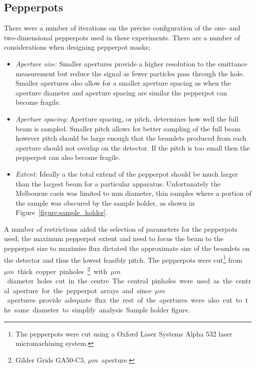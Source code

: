 \subsection{Pepperpots}
There were a number of iterations on the precise configuration of the one- and two-dimensional pepperpots used in these experiments.
There are a number of considerations when designing pepperpot masks;
\begin{itemize}
    \item{\emph{Aperture size:} Smaller apertures provide a higher resolution to the emittance measurement but reduce the signal as fewer particles pass through the hole.
    Smaller apertures also allow for a smaller aperture spacing as when the aperture diameter and aperture spacing are similar the pepperpot can become fragile.}
    \item{\emph{Aperture spacing:} Aperture spacing, or pitch, determines how well the full beam is sampled.
    Smaller pitch allows for better sampling of the full beam however pitch should be large enough that the beamlets produced from each aperture should not overlap on the detector.
    If the pitch is too small then the pepperpot can also become fragile.}
    \item{\emph{Extent:} Ideally a the total extend of the pepperpot should be much larger than the largest beam for a particular apparatus.
    Unfortunately the Melbourne \gls{caeis} was limited to \unit[3]{mm} diameter, thin samples where a portion of the sample was obscured by the sample holder, as shown in Figure~\ref{figure:sample_holder}.}
\end{itemize}

A number of restrictions aided the selection of parameters for the pepperpots used, the maximum pepperpot extent and need to focus the beam to the pepperpot size to maximise flux dictated the approximate size of the beamlets on the detector and thus the lowest feasibly pitch.
The pepperpots were cut\footnote{The pepperpots were cut using a Oxford Laser Systems Alpha 532 laser micromachining system.} from \unit[25]{$\mu m$} thick copper pinholes\footnote{Gilder Grids GA50-C3, \unit[50]{$\mu m$} aperture.} with \unit[50]{$\mu m$} diameter holes cut in the centre.
The central pinholes were used as the central aperture for the pepperpot arrays and since \unit[50]{$\mu m$} apertures provide adequate flux the rest of the apertures were also cut to the same diameter to simplify analysis.

{\color{red}Sample holder figure.}

